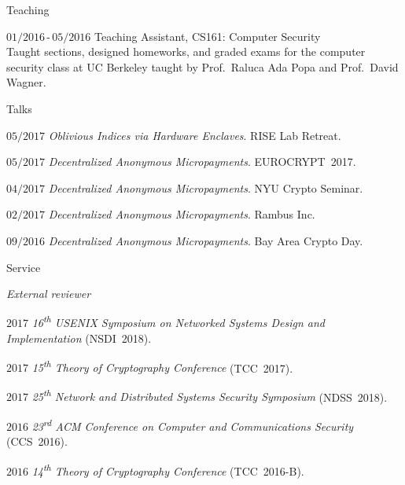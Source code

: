 \documentclass[11pt]{article}
\begin{document}
\begin{cv}{\vspace{-5em}}
    \small
    \begin{bibunit}[alpha]
      \nocite{ChiesaGLMMM17, CarliniMVZSSWZ16, HoLMHSW16, PortnoffLEMLW15}
    \putbib[pubs]
    \end{bibunit}
  \begin{cvlist}{Teaching}
  \item[\small$01/2016$\,-\,$05/2016$] Teaching Assistant, \textsc{CS161}: Computer Security\\
    {\small
    Taught sections, designed homeworks, and graded exams for the computer security class at UC Berkeley taught by Prof.~Raluca Ada Popa and Prof.~David Wagner.}
  \end{cvlist}
  \begin{cvlist}{Talks}
    \small
    \item[\small$05/2017$] \emph{Oblivious Indices via Hardware Enclaves}. RISE Lab Retreat.
    \item[\small$05/2017$] \emph{Decentralized Anonymous Micropayments}. EUROCRYPT~2017.
    \item[\small$04/2017$] \emph{Decentralized Anonymous Micropayments}. NYU Crypto Seminar.
    \item[\small$02/2017$] \emph{Decentralized Anonymous Micropayments}. Rambus Inc.
    \item[\small$09/2016$] \emph{Decentralized Anonymous Micropayments}. Bay Area Crypto Day.
  \end{cvlist}
  \begin{cvlist}{Service}
    \small
    \item[\emph{External reviewer}]
    \item[\small $2017$] \emph{16\textsuperscript{th} USENIX Symposium on Networked Systems Design and Implementation} (NSDI~2018).
    \item[\small $2017$] \emph{15\textsuperscript{th} Theory of Cryptography Conference} (TCC~2017).
    \item[\small $2017$] \emph{25\textsuperscript{th} Network and Distributed Systems Security Symposium} (NDSS~2018).
    \item[\small $2016$] \emph{23\textsuperscript{rd} ACM Conference on Computer and Communications Security} (CCS~2016).
    \item[\small $2016$] \emph{14\textsuperscript{th} Theory of Cryptography Conference} (TCC~2016-B).
  \end{cvlist}
\end{cv}
\end{document}
